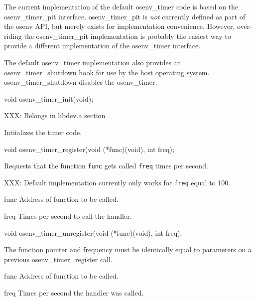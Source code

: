 The current implementation of the default osenv_timer code is
based on the osenv_timer_pit interface.
{osenv_timer_pit} is \emph{not} currently defined as part of the osenv API,
but merely exists for implementation convenience.
However, over-riding the osenv_timer_pit implementation is probably the
easiest way to provide a different implementation of the
osenv_timer interface.

The default osenv_timer implementation also provides an
osenv_timer_shutdown hook for use by the host operating system.
{osenv_timer_shutdown} disables the osenv_timer.


\begin{apisyn}
	\funcproto void osenv_timer_init(void);
\end{apisyn}
\drvtoosn
\begin{apidesc}
	XXX: Belongs in libdev.a section

	Intiializes the timer code.
\end{apidesc}


\begin{apisyn}
	\funcproto void osenv_timer_register(void (*func)(void), int freq);
\end{apisyn}
\drvtoosn
\begin{apidesc}
	Requests that the function {\tt func} gets called {\tt freq} times
	per second.

	XXX: Default implementation currently only works for {\tt freq}
	equal to 100.
\end{apidesc}
\begin{apiparm}
	\item[func]
		Address of function to be called.
	\item[freq]
		Times per second to call the handler.
\end{apiparm}


\begin{apisyn}
	\funcproto void osenv_timer_unregister(void (*func)(void), int freq);
\end{apisyn}
\drvtoosn
\begin{apidesc}
	The function pointer and frequency must be identically equal
to parameters on a previous osenv_timer_register call.
\end{apidesc}
\begin{apiparm}
	\item[func]
		Address of function to be called.
	\item[freq]
		Times per second the handler was called.
\end{apiparm}


